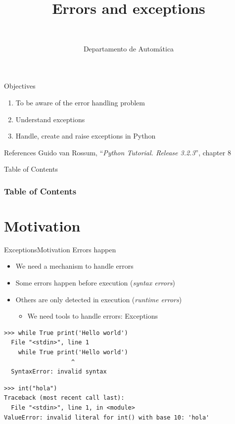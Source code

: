 \documentclass[10pt,compress]{beamer} %
\title[Errors and exceptions]{Errors and exceptions}
\author{\asignatura\\\carrera}
\institute{}
\date{Departamento de Automática}
\begin{document}
{\titlepageBlue
    \begin{frame}
        \titlepage
    \end{frame}
}

\institute{\asignatura}

\begin{frame}[plain]{}
	\begin{block}{Objectives}
		\begin{enumerate}
		\item To be aware of the error handling problem
		\item Understand exceptions
		\item Handle, create and raise exceptions in Python
		\end{enumerate}
	\end{block}

	\begin{block}{References}
		Guido van Rossum, ``\textit{Python Tutorial. Release 3.2.3}'', chapter 8
	\end{block}
\end{frame}

{
\begin{frame}[shrink]{Table of Contents}
 \frametitle{Table of Contents}
 \tableofcontents
\end{frame}
}

\section{Motivation}
\begin{frame}[fragile]{Exceptions}{Motivation}
	Errors happen
	\begin{itemize}
		\item We need a mechanism to handle errors
	    \item Some errors happen before execution (\textit{syntax errors})

		\item Others are only detected in execution (\textit{runtime errors})
        \begin{itemize}
        \item We need tools to handle errors: Exceptions
        \end{itemize}
    \end{itemize}
\begin{verbatim}
>>> while True print('Hello world')
  File "<stdin>", line 1
    while True print('Hello world')
                   ^
  SyntaxError: invalid syntax
\end{verbatim}

\begin{verbatim}
>>> int("hola")
Traceback (most recent call last):
  File "<stdin>", line 1, in <module>
ValueError: invalid literal for int() with base 10: 'hola'
\end{verbatim}
\end{frame}
\end{document}
